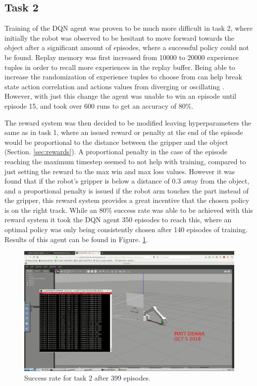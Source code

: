 \documentclass[1p, number, sort&compress,table, 11pt]{elsarticle}
\begin{document}
	\subsection{Task 2}\label{subsec:task2}

	Training of the DQN agent was proven to be much more difficult in task 2, where initially the robot was observed to be hesitant to move forward towards the object after a significant amount of episodes, where a successful policy could not be found. Replay memory was first increased from 10000 to 20000 experience tuples in order to recall more experiences in the replay buffer. Being able to increase the randomization of experience tuples to choose from can help break state action correlation and actions values from diverging or oscillating \cite{UdacityLesson23}. However, with just this change the agent was unable to win an episode until episode 15, and took over 600 runs to get an accuracy of 80\%.

	The reward system was then decided to be modified leaving hyperparameters the same as in task 1, where an issued reward or penalty at the end of the episode would be proportional to the distance between the gripper and the object (Section. \ref{sec:rewards}). A proportional penalty in the case of the episode reaching the maximum timestep seemed to not help with training, compared to just setting the reward to the max win and max loss values. However it was found that if the robot's gripper is below a distance of 0.3 away from the object, and a proportional penalty is issued if the robot arm touches the part instead of the gripper, this reward system provides a great incentive that the chosen policy is on the right track. While an 80\% success rate was able to be achieved with this reward system it took the DQN agent 350 episodes to reach this, where an optimal policy was only being consistently chosen after 140 episodes of training. Results of this agent can be found in Figure. \ref{fig:task2}.

	\begin{figure}[thpb]
		\centering
		\includegraphics[width=\linewidth]{../images/Deep_RL-task2.jpg}
		\caption{Success rate for task 2 after 399 episodes.}
		\label{fig:task2}
	\end{figure}
\end{document}
